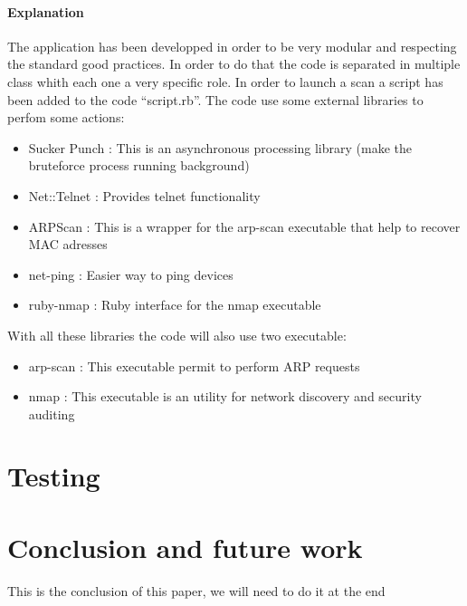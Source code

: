 \documentclass{report}
\begin{document}
\subsubsection{Explanation}
The application has been developped in order to be very modular and respecting the standard good practices. In order to do that the code is separated in multiple class whith each one a very specific role. In order to launch a scan a script has been added to the code ``script.rb''.\newline
The code use some external libraries to perfom some actions:
\begin{itemize}
 \item Sucker Punch \autocite{suckerpunch}: This is an asynchronous processing library (make the bruteforce process running background)
 \item Net::Telnet \autocite{nettelnet}: Provides telnet functionality
 \item ARPScan \autocite{arpscan}: This is a wrapper for the arp-scan executable that help to recover MAC adresses
 \item net-ping \autocite{netping}: Easier way to ping devices
 \item ruby-nmap \autocite{rubynmap}: Ruby interface for the nmap executable
\end{itemize}
With all these libraries the code will also use two executable:
\begin{itemize}
 \item arp-scan \autocite{arp-scan}: This executable permit to perform ARP requests
 \item nmap \autocite{nmap}: This executable is an utility for network discovery and security auditing
\end{itemize}

\chapter{Testing}

\chapter{Conclusion and future work}
This is the conclusion of this paper, we will need to do it at the end

\printbibliography

\listoffigures
\end{document}
